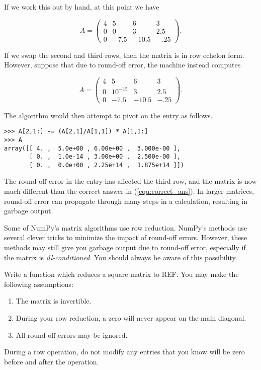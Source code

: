 If we work this out by hand, at this point we have

\begin{equation}\label{equ:correct_ans}
A = \begin{pmatrix}
4&5&6&3 \\
0&0&3&2.5 \\
0&-7.5&-10.5&-.25
\end{pmatrix}.
\end{equation}

If we swap the second and third rows, then the matrix is in row echelon form. 
However, suppose that due to round-off error, the machine instead computes

\[
A = \begin{pmatrix}
4&5&6&3 \\
0&10^{-15}&3&2.5 \\
0&-7.5&-10.5&-.25
\end{pmatrix}.
\]

The algorithm would then attempt to pivot on the  entry as follows.

\begin{lstlisting}
>>> A[2,1:] -= (A[2,1]/A[1,1]) * A[1,1:]
>>> A
array([[ 4. ,  5.0e+00 , 6.00e+00 ,  3.000e-00 ],
       [ 0. ,  1.0e-14 , 3.00e+00 ,  2.500e-00 ],
       [ 0. ,  0.0e+00 , 2.25e+14 ,  1.875e+14 ]])
\end{lstlisting}

The round-off error in the  entry has affected the third row, and the matrix is now much different than the correct answer in (\ref{equ:correct_ans}). 
In larger matrices, round-off error can propagate through many steps in a calculation, resulting in garbage output.

Some of NumPy's matrix algorithms use row reduction. 
NumPy's methods use several clever tricks to minimize the impact of round-off errors. 
However, these methods may still give you garbage output due to round-off error, especially if the matrix is \emph{ill-conditioned}. 
You should always be aware of this possibility.

\begin{problem}
\label{prob:REF}
Write a function which reduces a square matrix to REF. 
You may make the following assumptions:
\begin{enumerate}
\item The matrix is invertible.
\item During your row reduction, a zero will never appear on the main diagonal.
\item All round-off errors may be ignored.
\end{enumerate}
During a row operation, do not modify any entries that you know will be zero before and after the operation.
\end{problem}

